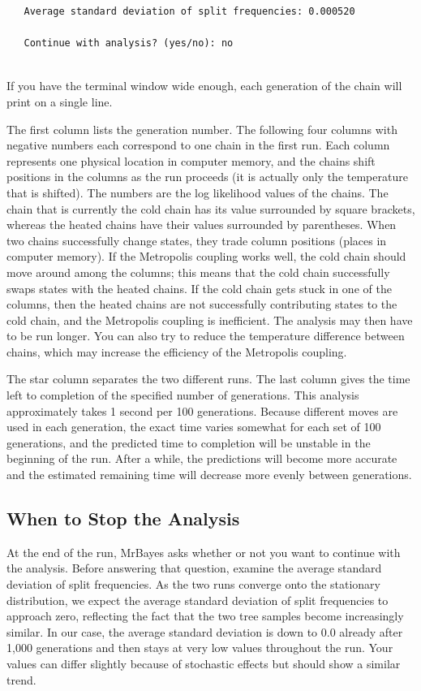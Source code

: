 \documentclass[12pt]{book}
\begin{document}
\begin{singlespacing}
\begin{verbatim}
   Average standard deviation of split frequencies: 0.000520

   Continue with analysis? (yes/no): no
  
\end{verbatim}
\normalsize
\end{singlespacing}

If you have the terminal window wide enough, each generation of the chain will print on a single line.

The first column lists the generation number. The following four columns with negative numbers each 
correspond to one chain in the first run. Each column represents one physical location in computer memory, 
and the chains shift positions in the columns as the run proceeds (it is actually only the temperature that 
is shifted). The numbers are the log likelihood values of the chains. The chain that is currently the cold 
chain has its value surrounded by square brackets, whereas the heated chains have their values surrounded by 
parentheses. When two chains successfully change states, they trade column positions (places in computer 
memory). If the Metropolis coupling works well, the cold chain should move around among the columns; this 
means that the cold chain successfully swaps states with the heated chains. If the cold chain gets stuck in 
one of the columns, then the heated chains are not successfully contributing states to the cold chain, and 
the Metropolis coupling is inefficient. The analysis may then have to be run longer. You can also try to 
reduce the temperature difference between chains, which may increase the efficiency of the Metropolis 
coupling.

The star column separates the two different runs. The last column gives the time left to completion of the 
specified number of generations. This analysis approximately takes 1 second per 100 generations. Because 
different moves are used in each generation, the exact time varies somewhat for each set of 100 generations, 
and the predicted time to completion will be unstable in the beginning of the run. After a while, the 
predictions will become more accurate and the estimated remaining time will decrease more evenly between 
generations.

\subsection{When to Stop the Analysis}

At the end of the run, MrBayes asks whether or not you want to continue with the analysis. Before answering 
that question, examine the average standard deviation of split frequencies. As the two runs converge onto 
the stationary distribution, we expect the average standard deviation of split frequencies to approach zero, 
reflecting the fact that the two tree samples become increasingly similar. In our case, the average standard 
deviation is down to 0.0 already after 1,000 generations and then stays at very low values throughout the 
run. Your values can differ slightly because of stochastic effects but should show a similar trend.
\end{document}
